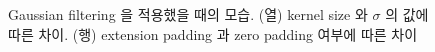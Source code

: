\documentclass[a4paper, 12p]{paper}
\begin{document}
\begin{figure}[H]
{}
\caption{Gaussian filtering 을 적용했을 때의 모습. (열) kernel size 와 $\sigma$ 의 값에 따른 차이. (행) extension padding 과 zero padding 여부에 따른 차이}\label{fig:gauss_result}
\end{figure}
\end{document}
